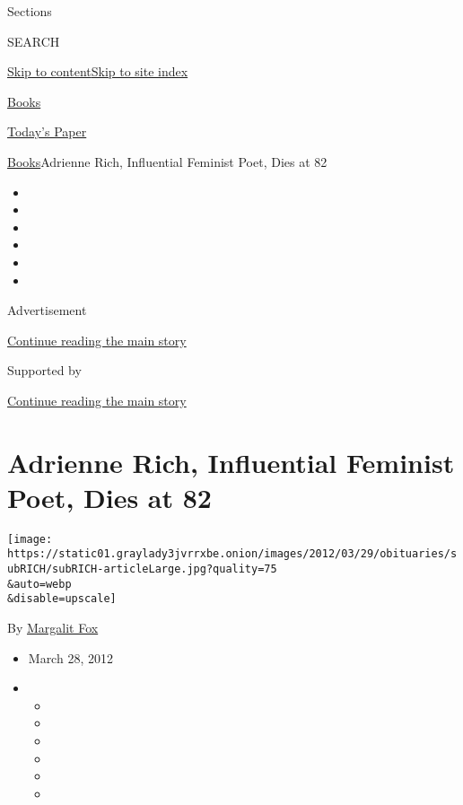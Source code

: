Sections

SEARCH

\protect\hyperlink{site-content}{Skip to
content}\protect\hyperlink{site-index}{Skip to site index}

\href{https://www.nytimes3xbfgragh.onion/section/books}{Books}

\href{https://myaccount.nytimes3xbfgragh.onion/auth/login?response_type=cookie\&client_id=vi}{}

\href{https://www.nytimes3xbfgragh.onion/section/todayspaper}{Today's
Paper}

\href{/section/books}{Books}\textbar{}Adrienne Rich, Influential
Feminist Poet, Dies at 82

\begin{itemize}
\item
\item
\item
\item
\item
\item
\end{itemize}

Advertisement

\protect\hyperlink{after-top}{Continue reading the main story}

Supported by

\protect\hyperlink{after-sponsor}{Continue reading the main story}

\hypertarget{adrienne-rich-influential-feminist-poet-dies-at-82}{%
\section{Adrienne Rich, Influential Feminist Poet, Dies at
82}\label{adrienne-rich-influential-feminist-poet-dies-at-82}}

\texttt{[image: https://static01.graylady3jvrrxbe.onion/images/2012/03/29/obituaries/subRICH/subRICH-articleLarge.jpg?quality=75\\\&auto=webp\\\&disable=upscale]}

By \href{https://www.nytimes3xbfgragh.onion/by/margalit-fox}{Margalit
Fox}

\begin{itemize}
\item
  March 28, 2012
\item
  \begin{itemize}
  \item
  \item
  \item
  \item
  \item
  \item
  \end{itemize}
\end{itemize}

